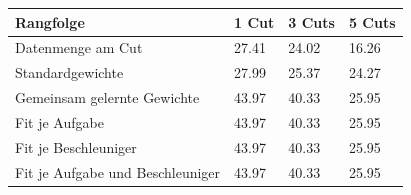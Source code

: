 \begin{tabular}{@{}llll@{}}
\toprule
Rangfolge & 1 Cut & 3 Cuts & 5 Cuts \\
\midrule
Datenmenge am Cut & 27.41 & 24.02 & 16.26 \\
Standardgewichte & 27.99 & 25.37 & 24.27 \\
Gemeinsam gelernte Gewichte & 43.97 & 40.33 & 25.95 \\
Fit je Aufgabe & 43.97 & 40.33 & 25.95 \\
Fit je Beschleuniger & 43.97 & 40.33 & 25.95 \\
Fit je Aufgabe und Beschleuniger & 43.97 & 40.33 & 25.95 \\
\bottomrule
\end{tabular}
